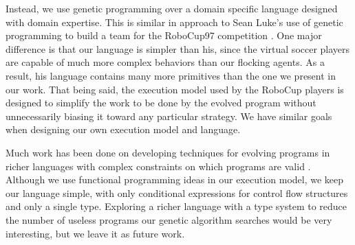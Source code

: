 Instead, we use genetic programming over a domain specific language designed
with domain expertise.
This is similar in approach to Sean Luke's use of genetic programming to build
a team for the RoboCup97 competition \cite{lukeRoboCup97}.
One major difference is that our language is simpler than his, since the
virtual soccer players are capable of much more complex behaviors than our
flocking agents.
As a result, his language contains many more primitives than the one we
present in our work.
That being said, the execution model used by the RoboCup players is designed to
simplify the work to be done by the evolved program without unnecessarily
biasing it toward any particular strategy.
We have similar goals when designing our own execution model and language.

Much work has been done on developing techniques for evolving programs in
richer languages with complex constraints on which programs are valid
\cite{BriggsGP}.
Although we use functional programming ideas in our execution model, we keep
our language simple, with only conditional expressions for control flow
structures and only a single type.
Exploring a richer language with a type system to reduce the number of useless
programs our genetic algorithm searches would be very interesting, but we leave
it as future work.

